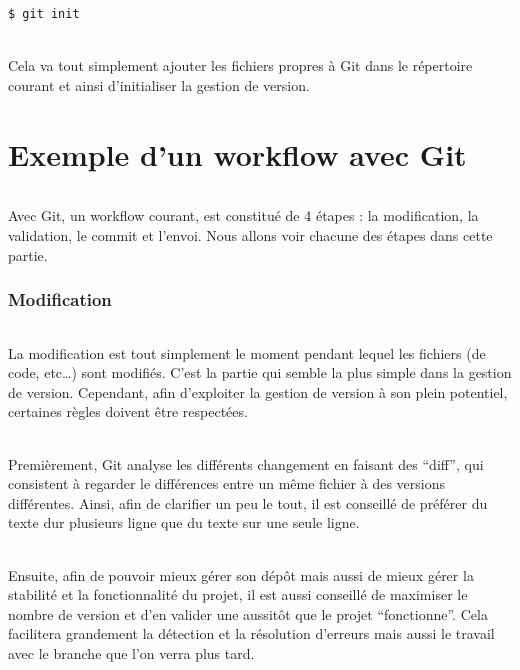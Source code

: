 \documentclass[french, a4paper, 12pt, titlepage]{article}
\begin{document}
\begin{lstlisting}
$ git init
\end{lstlisting}

\paragraph{} Cela va tout simplement ajouter les fichiers propres à Git dans le
répertoire courant et ainsi d'initialiser la gestion de version.

\part{Exemple d'un workflow avec Git}

\paragraph{} Avec Git, un workflow courant, est constitué de 4 étapes : la
modification, la validation, le commit et l'envoi. Nous allons voir chacune des
étapes dans cette partie.

\section{Modification}

\paragraph{} La modification est tout simplement le moment pendant lequel les
fichiers (de code, etc\dots) sont modifiés. C'est la partie qui semble la plus
simple dans la gestion de version. Cependant, afin d'exploiter la gestion de
version à son plein potentiel, certaines règles doivent être respectées.

\paragraph{} Premièrement, Git analyse les différents changement en faisant des
``diff'', qui consistent à regarder le différences entre un même fichier à des
versions différentes. Ainsi, afin de clarifier un peu le tout, il est conseillé
de préférer du texte dur plusieurs ligne que du texte sur une seule ligne.

\paragraph{} Ensuite, afin de pouvoir mieux gérer son dépôt mais aussi de mieux
gérer la stabilité et la fonctionnalité du projet, il est aussi conseillé de
maximiser le nombre de version et d'en valider une aussitôt que le projet
``fonctionne''. Cela facilitera grandement la détection et la résolution
d'erreurs mais aussi le travail avec le branche que l'on verra plus tard.

%
%
\end{document}
